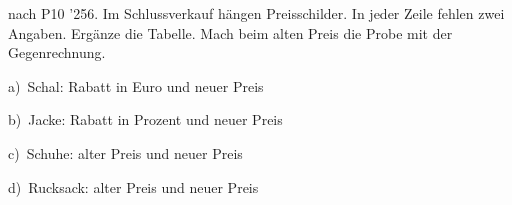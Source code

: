 \documentclass[11pt]{article}
\begin{document}
\begin{pfaufg}{nach P10 ’25}{6.}{}
Im Schlussverkauf hängen Preisschilder. In jeder Zeile fehlen zwei Angaben. Ergänze die Tabelle. Mach beim alten Preis die Probe mit der Gegenrechnung.\par\medskip{}\par\smallskip
\noindent\begin{minipage}[t]{0.48\linewidth}
a)\ Schal: Rabatt in Euro und neuer Preis
\end{minipage}\hfill
\begin{minipage}[t]{0.48\linewidth}
b)\ Jacke: Rabatt in Prozent und neuer Preis
\end{minipage}
\noindent\begin{minipage}[t]{0.48\linewidth}
c)\ Schuhe: alter Preis und neuer Preis
\end{minipage}\hfill
\begin{minipage}[t]{0.48\linewidth}
d)\ Rucksack: alter Preis und neuer Preis
\end{minipage}
\end{pfaufg}

\par\vfill{}
\end{document}
